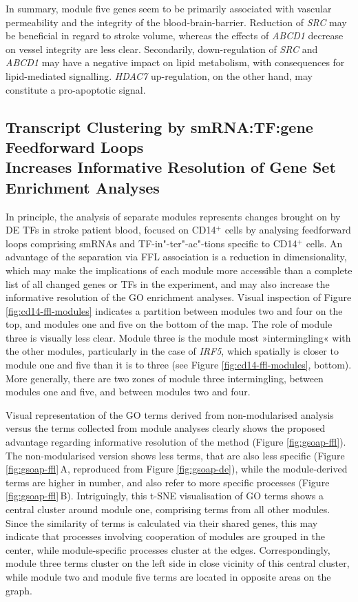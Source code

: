 In summary, module five genes seem to be primarily associated with vascular permeability and the integrity of the blood-brain-barrier. Reduction of \emph{SRC} may be beneficial in regard to stroke volume, whereas the effects of \emph{ABCD1} decrease on vessel integrity are less clear. Secondarily, down-regulation of \emph{SRC} and \emph{ABCD1} may have a negative impact on lipid metabolism, with consequences for lipid-mediated signalling. \emph{HDAC7} up-regulation, on the other hand, may constitute a pro-apoptotic signal.

\subsection{Transcript Clustering by smRNA:TF:gene Feedforward Loops \\Increases Informative Resolution of Gene Set Enrichment Analyses} \label{sec:stroke:resolution}
In principle, the analysis of separate modules represents changes brought on by DE TFs in stroke patient blood, focused on CD14$^+$ cells by analysing feedforward loops comprising smRNAs and TF-in"-ter"-ac"-tions specific to CD14$^+$ cells. An advantage of the separation via FFL association is a reduction in dimensionality, which may make the implications of each module more accessible than a complete list of all changed genes or TFs in the experiment, and may also increase the informative resolution of the GO enrichment analyses. Visual inspection of Figure \ref{fig:cd14-ffl-modules} indicates a partition between modules two and four on the top, and modules one and five on the bottom of the map. The role of module three is visually less clear. Module three is the module most »intermingling« with the other modules, particularly in the case of \emph{IRF5}, which spatially is closer to module one and five than it is to three (see Figure \ref{fig:cd14-ffl-modules}, bottom). More generally, there are two zones of module three intermingling, between modules one and five, and between modules two and four.

Visual representation of the GO terms derived from non-modularised analysis versus the terms collected from module analyses clearly shows the proposed advantage regarding informative resolution of the method (Figure \ref{fig:gsoap-ffl}). The non-modularised version shows less terms, that are also less specific (Figure \ref{fig:gsoap-ffl}\,A, reproduced from Figure \ref{fig:gsoap-de}), while the module-derived terms are higher in number, and also refer to more specific processes (Figure \ref{fig:gsoap-ffl}\,B). Intriguingly, this t-SNE visualisation of GO terms shows a central cluster around module one, comprising terms from all other modules. Since the similarity of terms is calculated via their shared genes, this may indicate that processes involving cooperation of modules are grouped in the center, while module-specific processes cluster at the edges. Correspondingly, module three terms cluster on the left side in close vicinity of this central cluster, while module two and module five terms are located in opposite areas on the graph.

